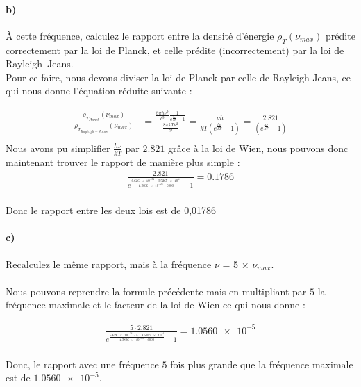 \documentclass[11pt, letterpaper]{article}
\begin{document}
\paragraph*{b)} À cette fréquence, calculez le rapport entre la densité d’énergie $\rho_T (\nu_{max})$ prédite correctement par la loi de Planck, et celle prédite (incorrectement) par la loi de Rayleigh–Jeans.\\

Pour ce faire, nous devons diviser la loi de Planck par celle de
Rayleigh-Jeans, ce qui nous donne l'équation réduite suivante :

\begin{align*}
    \frac{\rho_{T_{Planck}}(\nu _{max})}{\rho_{T_{Rayleigh-Jeans}}(\nu _{max})} & = \frac{\frac{8\pi h\nu ^3}{c^3}\frac{1}{e^{\frac{h\nu}{kT}}-1}}{\frac{8\pi kT\nu ^2}{c^3}} = \frac{\nu h}{kT(e^{\frac{h\nu}{kT}}-1)} = \frac{2.821}{(e^{\frac{h\nu}{kT}}-1)} \\
\end{align*}
Nous avons pu simplifier $\frac{h \nu}{kT} $ par $2.821$ grâce à la loi de Wien, nous pouvons donc maintenant trouver le rapport de manière plus simple :
\begin{align*}
    \frac{2.821}{e^{\frac{\num{6.626e-34}\ \cdot\  \num{3.5267e14}}{\num{1.3806e-23}\ \cdot \ 6000}}-1} = 0.1786\\
\end{align*}

\begin{tcolorbox}[tommy]
    Donc le rapport entre les deux lois est de 0,01786
\end{tcolorbox}
\newpage


\paragraph*{c)}
Recalculez le même rapport, mais à la fréquence $\nu$ = 5 × $\nu_{max}$. 
\\\\
Nous pouvons reprendre la formule précédente mais en multipliant par $5$ la fréquence maximale et le facteur de la loi de Wien ce qui nous donne :

\begin{align*}
    \frac{5 \cdot 2.821}{e^{\frac{\num{6.626e-34}\ \cdot \ 5 \  \cdot \ \num{3.5267e14}}{\num{1.3806e-23} \ \cdot \  6000}}-1} = \num{1.0560e-5}\\
\end{align*}

\begin{tcolorbox}[tommy]
    Donc, le rapport avec une fréquence $5$ fois plus grande que la fréquence maximale est de $\num{1.0560e-5}$.
\end{tcolorbox}
\vspace{1cm}
\end{document}
